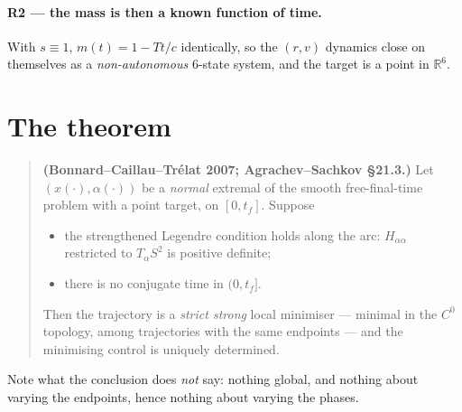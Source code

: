 \documentclass[11pt]{article}
\newcommand{\tf}{t_f}\newcommand{\R}{\mathbb{R}}
\begin{document}
\paragraph{R2 --- the mass is then a known function of time.} With $s\equiv1$,
$m(t)=1-Tt/c$ identically, so the $(r,v)$ dynamics close on themselves as a
\emph{non-autonomous} 6-state system, and the target is a point in $\R^6$.

\section{The theorem}
\begin{quote}
\textbf{(Bonnard--Caillau--Tr\'elat 2007; Agrachev--Sachkov \S21.3.)}
Let $(x(\cdot),\alpha(\cdot))$ be a \emph{normal} extremal of the smooth
free-final-time problem with a point target, on $[0,\tf]$. Suppose
\begin{itemize}
\item[\textbf{(H-a)}] the strengthened Legendre condition holds along the arc:
  $H_{\alpha\alpha}$ restricted to $T_\alpha S^2$ is positive definite;
\item[\textbf{(H-b)}] there is no conjugate time in $(0,\tf]$.
\end{itemize}
Then the trajectory is a \emph{strict strong} local minimiser --- minimal in
the $C^0$ topology, among trajectories with the same endpoints --- and the
minimising control is uniquely determined.
\end{quote}
Note what the conclusion does \emph{not} say: nothing global, and nothing
about varying the endpoints, hence nothing about varying the phases.
\end{document}
